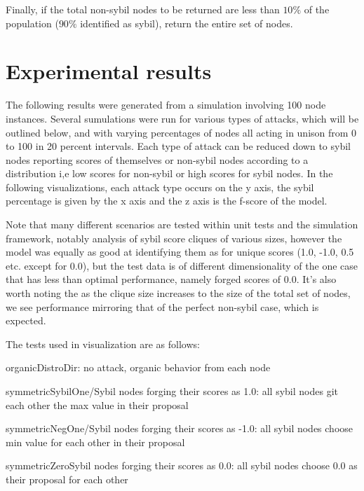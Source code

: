 \documentclass{article}
\begin{document}
Finally, if the total non-sybil nodes to be returned are less than $10\%$ of the population ($90\%$ identified as sybil), return the entire set of nodes.


\section{Experimental results}
The following results were generated from a simulation involving 100 node instances. Several sumulations were run for various types of attacks, which will be outlined below, and with varying percentages of nodes all acting in unison from 0 to 100 in 20 percent intervals. Each type of attack can be reduced down to sybil nodes reporting scores of themselves or non-sybil nodes according to a distribution i,e low scores for non-sybil or high scores for sybil nodes. In the following visualizations, each attack type occurs on the y axis, the sybil percentage is given by the x axis and the z axis is the f-score of the model.

Note that many different scenarios are tested within unit tests and the simulation framework, notably analysis of sybil score cliques of various sizes, however the model was equally as good at identifying them as for unique scores (1.0, -1.0, 0.5 etc. except for 0.0), but the test data is of different dimensionality of the one case that has less than optimal performance, namely forged scores of 0.0. It's also worth noting the as the clique size increases to the size of the total set of nodes, we see performance mirroring that of the perfect non-sybil case, which is expected. 

The tests used in visualization are as follows:

organicDistroDir: no attack, organic behavior from each node

symmetricSybilOne/Sybil nodes forging their scores as 1.0: all sybil nodes git each other the max value in their proposal

symmetricNegOne/Sybil nodes forging their scores as -1.0: all sybil nodes choose min value for each other in their proposal

symmetricZeroSybil nodes forging their scores as 0.0: all sybil nodes choose 0.0 as their proposal for each other
\end{document}
